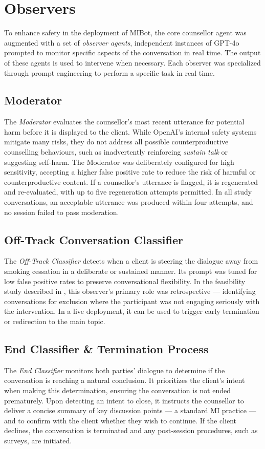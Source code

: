 \section{Observers}
\label{sec:observers}
To enhance safety in the deployment of MIBot, the core counsellor agent was augmented with a set of \textit{observer agents}, independent instances of GPT-4o prompted to monitor specific aspects of the conversation in real time. The output of these agents is used to intervene when necessary. Each observer was specialized through prompt engineering to perform a specific task in real time.

\subsection{Moderator}
The \textit{Moderator} evaluates the counsellor's most recent utterance for potential harm before it is displayed to the client. While OpenAI's internal safety systems mitigate many risks, they do not address all possible counterproductive counselling behaviours, such as inadvertently reinforcing \emph{sustain talk} or suggesting self-harm. The Moderator was deliberately configured for high sensitivity, accepting a higher false positive rate to reduce the risk of harmful or counterproductive content. If a counsellor's utterance is flagged, it is regenerated and re-evaluated, with up to five regeneration attempts permitted. In all study conversations, an acceptable utterance was produced within four attempts, and no session failed to pass moderation.

\subsection{Off-Track Conversation Classifier}
The \textit{Off-Track Classifier} detects when a client is steering the dialogue away from smoking cessation in a deliberate or sustained manner. Its prompt was tuned for low false positive rates to preserve conversational flexibility. In the feasibility study described in , this observer's primary role was retrospective --- identifying conversations for exclusion where the participant was not engaging seriously with the intervention. In a live deployment, it can be used to trigger early termination or redirection to the main topic.

\subsection{End Classifier \& Termination Process}
The \textit{End Classifier} monitors both parties' dialogue to determine if the conversation is reaching a natural conclusion. It prioritizes the client's intent when making this determination, ensuring the conversation is not ended prematurely. Upon detecting an intent to close, it instructs the counsellor to deliver a concise summary of key discussion points --- a standard MI practice --- and to confirm with the client whether they wish to continue. If the client declines, the conversation is terminated and any post-session procedures, such as surveys, are initiated.


